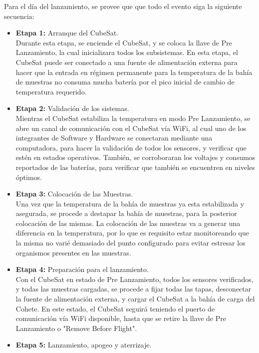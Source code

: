   Para el día del lanzamiento, se provee que que todo el evento siga la siguiente secuencia:
  \begin{itemize}
    \item \textbf{Etapa 1:} Arranque del CubeSat.\\
      Durante esta etapa, se enciende el CubeSat, y se coloca la llave de Pre Lanzamiento, la cual inicializara todos
      los subsistemas. En esta etapa, el CubeSat puede ser conectado a una fuente de alimentación externa para hacer que
      la entrada en régimen permanente para la temperatura de la bahía de muestras no consuma mucha batería por el pico inicial
      de cambio de temperatura requerido.
    \item \textbf{Etapa 2:} Validación de los sistemas.\\
      Mientras el CubeSat estabiliza la temperatura en modo Pre Lanzamiento, se abre un canal de comunicación con el
      CubeSat vía WiFi, al cual uno de los integrantes de Software y Hardware se conectaran mediante una computadora,
      para hacer la validación de todos los sensores, y verificar que estén en estados operativos. También, se
      corroboraran los voltajes y consumos reportados de las baterías, para verificar que también se encuentren en
      niveles óptimos.
    \item \textbf{Etapa 3:} Colocación de las Muestras.\\
      Una vez que la temperatura de la bahía de muestras ya esta estabilizada y asegurada, se procede a destapar la
      bahía de muestras, para la posterior colocación de las mismas. La colocación de las muestras va a generar una
      diferencia en la temperatura, por lo que es requisito estar monitoreando que la misma no varié demasiado del punto
      configurado para evitar estresar los organismos presentes en las muestras.
    \item \textbf{Etapa 4:} Preparación para el lanzamiento.\\
      Con el CubeSat en estado de Pre Lanzamiento, todos los sensores verificados, y todas las muestras cargadas, se
      procede a fijar todas las tapas, desconectar la fuente de alimentación externa, y cargar el CubeSat a la bahía de
      carga del Cohete. En este estado, el CubeSat seguirá teniendo el puerto de comunicación vía WiFi disponible, hasta
      que se retire la llave de Pre Lanzamiento o "Remove Before Flight".
    \item \textbf{Etapa 5:} Lanzamiento, apogeo y aterrizaje.\\

\end{itemize}

